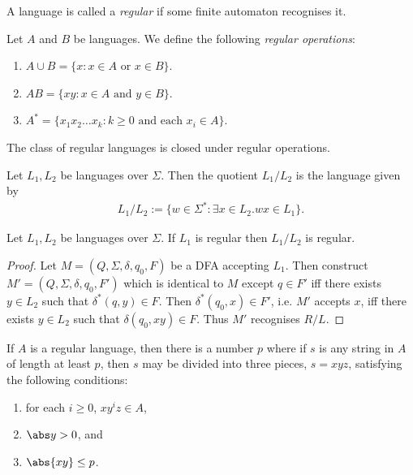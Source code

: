 \documentclass{article}
\begin{document}
\begin{definition*}
	A language is called a \emph{regular} if some finite automaton recognises it.
\end{definition*}

\begin{definition*}
	Let $A$ and $B$ be languages. We define the following \emph{regular operations}:
	\begin{enumerate}
		\item $A\cup B=\{x : x \in A \text{ or } x \in B\}$.
		\item $AB=\{xy : x \in A \text{ and } y \in B\}$.
		\item $A^* = \{x_1x_2\dots x_k:k\geq 0 \text{ and each }x_i\in A\}$.
	\end{enumerate}
\end{definition*}

\begin{theorem*}[Sipser p. 45, 60, 62]
	The class of regular languages is closed under regular operations.
\end{theorem*}

\begin{definition*}[Quotient]
	Let $L_1,L_2$ be languages over $\Sigma$. Then the quotient $L_1/L_2$ is the language
	given by
	\begin{align*}
		L_1/L_2 := \{w \in \Sigma^* : \exists x\in L_2. wx \in L_1\}.
	\end{align*}
\end{definition*}

\begin{theorem*}
	Let $L_1,L_2$ be languages over $\Sigma$. If $L_1$ is regular then $L_1/L_2$ is regular.
	\begin{proof}
		Let $M=(Q, \Sigma, \delta, q_0, F)$ be a DFA accepting $L_1$. Then construct $M'=(Q,\Sigma,\delta,q_0,F')$
		which is identical to $M$ except $q\in F'$ iff there exists $y\in L_2$ such that
		$\delta^*(q, y)\in F$.
		Then $\delta^*(q_0, x)\in F'$, i.e. $M'$ accepts $x$, iff there exists $y\in L_2$
		such that $\delta(q_0,xy)\in F$. Thus $M'$ recognises $R/L$.
	\end{proof}
\end{theorem*}

\begin{theorem*}
	If $A$ is a regular language, then there is a number $p$ where if $s$
	is any string in $A$ of length at least $p$, then $s$ may be divided
	into three pieces, $s=xyz$, satisfying the following conditions:
	\begin{enumerate}
		\item for each $i\geq 0$, $xy^iz\in A$,
		\item $\abs y > 0$, and
		\item $\abs{xy} \leq p$.
	\end{enumerate}
\end{theorem*}
\end{document}
